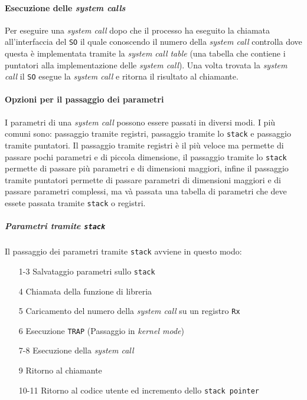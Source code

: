             \paragraph{Esecuzione delle \textit{system calls}} Per eseguire una \textit{system call} dopo che il processo ha eseguito la chiamata all'interfaccia del \texttt{SO} il quale conoscendo il numero della \textit{system call} controlla dove questa è implementata tramite la \textit{system call table} (una tabella che contiene i puntatori alla implementazione delle \textit{system call}). Una volta trovata la \textit{system call} il \texttt{SO} esegue la \textit{system call} e ritorna il risultato al chiamante.
            \paragraph{Opzioni per il passaggio dei parametri} I parametri di una \textit{system call} possono essere passati in diversi modi. I più comuni sono: passaggio tramite registri, passaggio tramite lo \texttt{stack} e passaggio tramite puntatori. Il passaggio tramite registri è il più veloce ma permette di passare pochi parametri e di piccola dimensione, il passaggio tramite lo \texttt{stack} permette di passare più parametri e di dimensioni maggiori, infine il passaggio tramite puntatori permette di passare parametri di dimensioni maggiori e di passare parametri complessi, ma và passata una tabella di parametri che deve essete passata tramite \texttt{stack} o registri.
                \subparagraph{Parametri tramite \texttt{stack}} Il passaggio dei parametri tramite \texttt{stack} avviene in questo modo:
                    \begin{enumerate}
                        \item[1-3] Salvataggio parametri sullo \texttt{stack}
                        \item[4] Chiamata della funzione di libreria
                        \item[5] Caricamento del numero della \textit{system call} su un registro \texttt{Rx}
                        \item[6] Esecuzione \texttt{TRAP} (Passaggio in \textit{kernel mode})
                        \item[7-8] Esecuzione della \textit{system call}
                        \item[9] Ritorno al chiamante 
                        \item[10-11] Ritorno al codice utente ed incremento dello \texttt{stack pointer} 
                    \end{enumerate}
